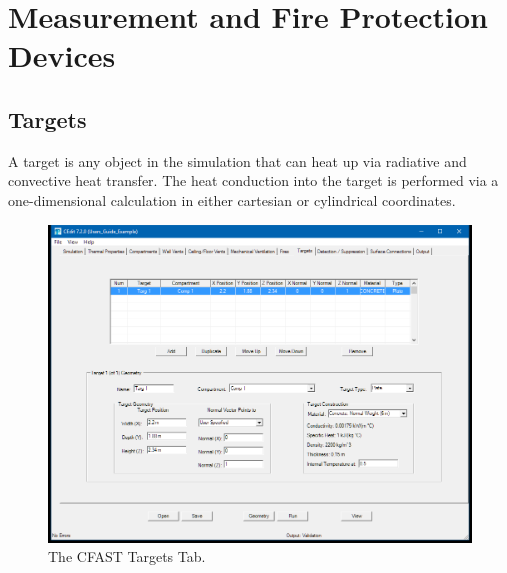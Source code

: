 \chapter{Measurement and Fire Protection Devices}
\label{info:DEVC}
\section{Targets}
\label{chapter:targets}

A target is any object in the simulation that can heat up via radiative and convective heat transfer. The heat conduction into the target is performed via a one-dimensional calculation in either cartesian or cylindrical coordinates.

\begin{figure}[h!]
\begin{center}
\includegraphics[width=6.5in]{FIGURES/Target_Tab}
\caption[The CFAST Targets Tab]{The CFAST Targets Tab.}
\end{center}
\end{figure}

